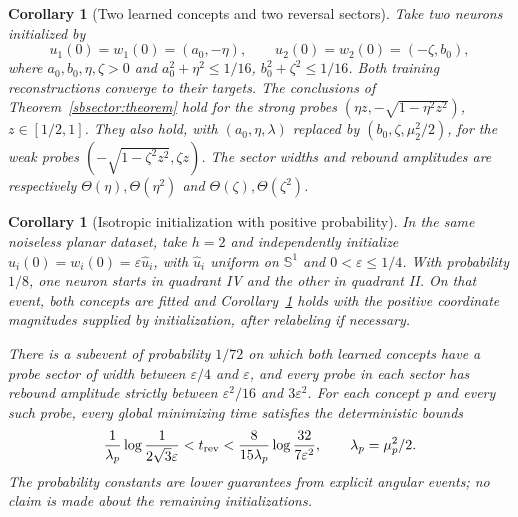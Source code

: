 \documentclass[10pt]{article}
\newtheorem{corollary}[theorem]{Corollary}
\theoremstyle{remark}\newtheorem{remark}[theorem]{Remark}
\begin{document}
\begin{corollary}[Two learned concepts and two reversal sectors]
\label{sbsector:two-concept}
Take two neurons initialized by
\[
 u_1(0)=w_1(0)=(a_0,-\eta),\qquad
 u_2(0)=w_2(0)=(-\zeta,b_0),
\]
where $a_0,b_0,\eta,\zeta>0$ and
$a_0^2+\eta^2\le1/16$, $b_0^2+\zeta^2\le1/16$.
Both training reconstructions converge to their targets. The conclusions
of Theorem~\ref{sbsector:theorem} hold for the strong probes
$(\eta z,-\sqrt{1-\eta^2z^2})$, $z\in[1/2,1]$.
They also hold, with $(a_0,\eta,\lambda)$ replaced by
$(b_0,\zeta,\mu_2^2/2)$, for the weak probes
$(-\sqrt{1-\zeta^2z^2},\zeta z)$.
The sector widths and rebound amplitudes are respectively
$\Theta(\eta),\Theta(\eta^2)$ and
$\Theta(\zeta),\Theta(\zeta^2)$.
\end{corollary}

\begin{corollary}[Isotropic initialization with positive probability]
\label{sbsector:isotropic}
In the same noiseless planar dataset, take $h=2$ and independently
initialize $u_i(0)=w_i(0)=\varepsilon\widehat u_i$, with
$\widehat u_i$ uniform on $\mathbb S^1$ and $0<\varepsilon\le1/4$.
With probability $1/8$, one neuron starts in quadrant IV and the other
in quadrant II. On that event, both concepts are fitted and
Corollary~\ref{sbsector:two-concept} holds with the positive coordinate
magnitudes supplied by initialization, after relabeling if necessary.

There is a subevent of probability $1/72$ on which both learned
concepts have a probe sector of width between $\varepsilon/4$ and
$\varepsilon$, and every probe in each sector has rebound amplitude
strictly between $\varepsilon^2/16$ and $3\varepsilon^2$.
For each concept $p$ and every such probe, every global minimizing time
satisfies the deterministic bounds
\begin{equation}\label{sbsector:isotropic-time}
 \frac1{\lambda_p}\log\frac1{2\sqrt3\varepsilon}
 <t_{\rm rev}
 <\frac8{15\lambda_p}\log\frac{32}{7\varepsilon^2},
 \qquad \lambda_p=\mu_p^2/2.
\end{equation}
The probability constants are lower guarantees from explicit angular
events; no claim is made about the remaining initializations.
\end{corollary}
\end{document}
